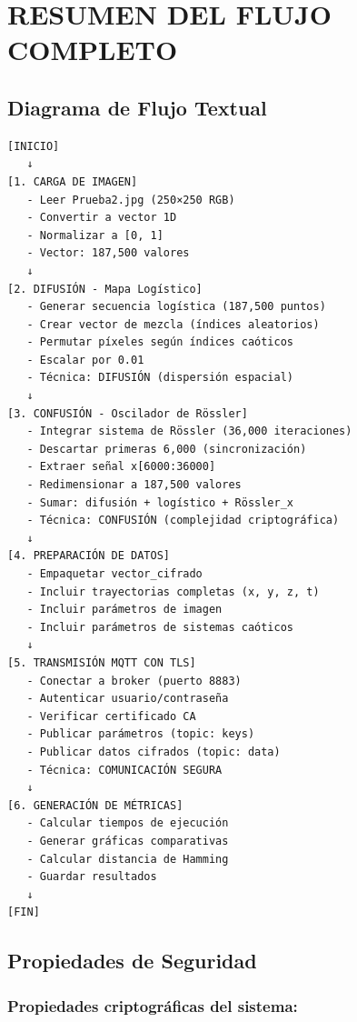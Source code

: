 \documentclass[12pt,a4paper]{article}
\begin{document}
\section{RESUMEN DEL FLUJO COMPLETO}

\subsection{Diagrama de Flujo Textual}

\begin{verbatim}
[INICIO]
   ↓
[1. CARGA DE IMAGEN]
   - Leer Prueba2.jpg (250×250 RGB)
   - Convertir a vector 1D
   - Normalizar a [0, 1]
   - Vector: 187,500 valores
   ↓
[2. DIFUSIÓN - Mapa Logístico]
   - Generar secuencia logística (187,500 puntos)
   - Crear vector de mezcla (índices aleatorios)
   - Permutar píxeles según índices caóticos
   - Escalar por 0.01
   - Técnica: DIFUSIÓN (dispersión espacial)
   ↓
[3. CONFUSIÓN - Oscilador de Rössler]
   - Integrar sistema de Rössler (36,000 iteraciones)
   - Descartar primeras 6,000 (sincronización)
   - Extraer señal x[6000:36000]
   - Redimensionar a 187,500 valores
   - Sumar: difusión + logístico + Rössler_x
   - Técnica: CONFUSIÓN (complejidad criptográfica)
   ↓
[4. PREPARACIÓN DE DATOS]
   - Empaquetar vector_cifrado
   - Incluir trayectorias completas (x, y, z, t)
   - Incluir parámetros de imagen
   - Incluir parámetros de sistemas caóticos
   ↓
[5. TRANSMISIÓN MQTT CON TLS]
   - Conectar a broker (puerto 8883)
   - Autenticar usuario/contraseña
   - Verificar certificado CA
   - Publicar parámetros (topic: keys)
   - Publicar datos cifrados (topic: data)
   - Técnica: COMUNICACIÓN SEGURA
   ↓
[6. GENERACIÓN DE MÉTRICAS]
   - Calcular tiempos de ejecución
   - Generar gráficas comparativas
   - Calcular distancia de Hamming
   - Guardar resultados
   ↓
[FIN]
\end{verbatim}

\subsection{Propiedades de Seguridad}

\subsubsection*{Propiedades criptográficas del sistema:}
\end{document}
